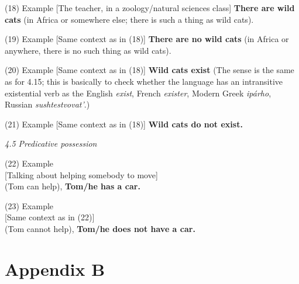 ﻿\documentclass[output=paper]{langsci/langscibook}
\begin{document}
\begin{unindented}
(18) Example [The teacher, in a zoology/natural sciences class]
\textbf{There are wild cats} (in Africa or somewhere else; there is such a
thing as wild cats). 

(19) Example [Same context as in (18)] \textbf{There are no
wild cats} (in Africa or anywhere, there is no such thing as wild cats). 

(20) Example [Same context as in (18)] \textbf{Wild cats exist} (The sense
is the same as for 4.15; this is basically to check whether the language
has an intransitive existential verb as the English \textit{exist}, French
\textit{exister}, Modern Greek \textit{ipárho}, Russian
\textit{sushtestvovat’}.) 

(21) Example [Same context as in (18)] \textbf{Wild cats do not exist.} 

\textit{4.5 Predicative possession}

(22) Example\\
{}[Talking about helping somebody to move]\\
(Tom can help), \textbf{Tom/he has a car.}

(23) Example\\
{}[Same context as in (22)]\\
(Tom cannot help), \textbf{Tom/he does not have a car.}
\end{unindented}

\section*{Appendix B}\label{AppendixB}
\end{document}
